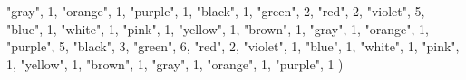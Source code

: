 \documentclass[
]{article}
\newenvironment{Shaded}{\begin{snugshade}}{\end{snugshade}}
\newcommand{\DecValTok}[1]{\textcolor[rgb]{0.00,0.00,0.81}{#1}}
\newcommand{\NormalTok}[1]{#1}
\newcommand{\StringTok}[1]{\textcolor[rgb]{0.31,0.60,0.02}{#1}}
\begin{document}
\begin{Shaded}
\begin{Highlighting}[]
  \StringTok{"gray"}\NormalTok{, }\DecValTok{1}\NormalTok{,}
  \StringTok{"orange"}\NormalTok{, }\DecValTok{1}\NormalTok{,}
  \StringTok{"purple"}\NormalTok{, }\DecValTok{1}\NormalTok{,}
    \StringTok{"black"}\NormalTok{, }\DecValTok{1}\NormalTok{,}
  \StringTok{"green"}\NormalTok{, }\DecValTok{2}\NormalTok{,}
  \StringTok{"red"}\NormalTok{, }\DecValTok{2}\NormalTok{,}
  \StringTok{"violet"}\NormalTok{, }\DecValTok{5}\NormalTok{,}
  \StringTok{"blue"}\NormalTok{, }\DecValTok{1}\NormalTok{,}
  \StringTok{"white"}\NormalTok{, }\DecValTok{1}\NormalTok{,}
  \StringTok{"pink"}\NormalTok{, }\DecValTok{1}\NormalTok{,}
  \StringTok{"yellow"}\NormalTok{, }\DecValTok{1}\NormalTok{,}
  \StringTok{"brown"}\NormalTok{, }\DecValTok{1}\NormalTok{,}
  \StringTok{"gray"}\NormalTok{, }\DecValTok{1}\NormalTok{,}
  \StringTok{"orange"}\NormalTok{, }\DecValTok{1}\NormalTok{,}
  \StringTok{"purple"}\NormalTok{, }\DecValTok{5}\NormalTok{,}
    \StringTok{"black"}\NormalTok{, }\DecValTok{3}\NormalTok{,}
  \StringTok{"green"}\NormalTok{, }\DecValTok{6}\NormalTok{,}
  \StringTok{"red"}\NormalTok{, }\DecValTok{2}\NormalTok{,}
  \StringTok{"violet"}\NormalTok{, }\DecValTok{1}\NormalTok{,}
  \StringTok{"blue"}\NormalTok{, }\DecValTok{1}\NormalTok{,}
  \StringTok{"white"}\NormalTok{, }\DecValTok{1}\NormalTok{,}
  \StringTok{"pink"}\NormalTok{, }\DecValTok{1}\NormalTok{,}
  \StringTok{"yellow"}\NormalTok{, }\DecValTok{1}\NormalTok{,}
  \StringTok{"brown"}\NormalTok{, }\DecValTok{1}\NormalTok{,}
  \StringTok{"gray"}\NormalTok{, }\DecValTok{1}\NormalTok{,}
  \StringTok{"orange"}\NormalTok{, }\DecValTok{1}\NormalTok{,}
  \StringTok{"purple"}\NormalTok{, }\DecValTok{1}
\NormalTok{)}


\end{Highlighting}
\end{Shaded}
\end{document}
